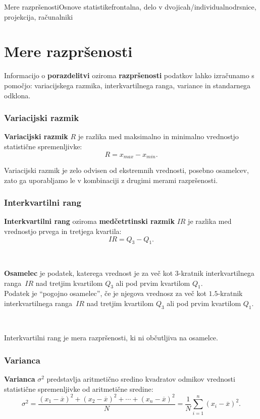 \begin{priprava}{4}{}{Mere razpršenosti}{Osnove statistike}{frontalna, delo v dvojicah/individualno}{drsnice, projekcija, računalniki}

    \section{Mere razpršenosti}

        

            
    Informacijo o \textbf{porazdelitvi} oziroma \textbf{razpršenosti} podatkov lahko izračunamo s pomočjo: 
    variacijskega razmika, interkvartilnega ranga, variance in standarnega odklona.

\subsubsection{Variacijski razmik}
    \textbf{Variacijski razmik} $R$ je razlika med maksimalno in minimalno vrednostjo statistične spremenljivke:
    $$R=x_{max}-x_{min}.$$



    Variacijski razmik je zelo odvisen od ekstremnih vrednosti, posebno osamelcev, 
    zato ga uporabljamo le v kombinaciji z drugimi merami razpršenosti.





\subsubsection{Interkvartilni rang}
    \textbf{Interkvartilni rang} oziroma \textbf{medčetrtinski razmik} $IR$ je razlika med vrednostjo prvega in tretjega kvartila:
    $$IR=Q_3-Q_1.$$

~

    \textbf{Osamelec} je podatek, katerega vrednost je za več kot $3$-kratnik interkvartilnega ranga~$IR$ nad tretjim kvartilom $Q_3$ ali pod prvim kvartilom $Q_1$. \\
    Podatek je ``pogojno osamelec'', če je njegova vrednosz za več kot $1.5$-kratnik interkvartilnega ranga~$IR$ nad tretjim kvartilom $Q_3$ ali pod prvim kvartilom $Q_1$.


~   

    Interkvartilni rang je mera razpršenosti, ki ni občutljiva na osamelce.





\subsubsection{Varianca}
    \textbf{Varianca} $\sigma^2$ predstavlja aritmetično sredino kvadratov odmikov vrednosti statistične spremenljivke od aritmetične sredine:
    $$\sigma^2=\dfrac{(x_1-\overline{x})^2+(x_2-\overline{x})^2+\cdots+(x_n-\overline{x})^2}{N}=\dfrac{1}{N}\sum_{i=1}^n(x_i-\overline{x})^2.$$



\end{priprava}
